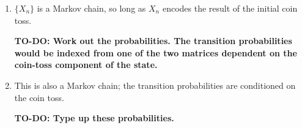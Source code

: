 \begin{solution}
    \begin{enumerate}
        \item $\{X_n\}$ is a Markov chain, so long as $X_n$ encodes the
            result of the initial coin toss.

            \textbf{TO-DO: Work out the probabilities. The transition
                probabilities would be indexed from one of the two
                matrices dependent on the coin-toss component of the
            state.}

        \item This is also a Markov chain; the transition probabilities
            are conditioned on the coin toss.

            \textbf{TO-DO: Type up these probabilities.}
    \end{enumerate}
\end{solution}
